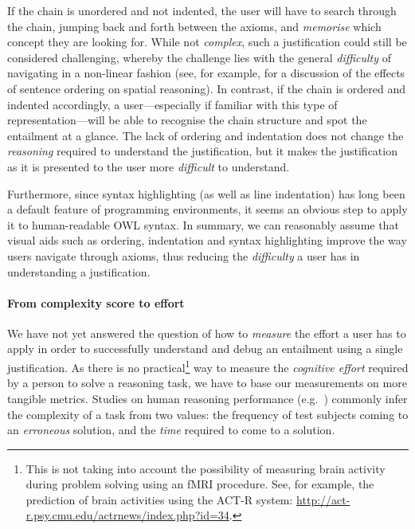 If the chain is unordered and not indented, the user will have to search through the chain, jumping back and forth between the axioms, and \emph{memorise} which concept they are looking for. While not \emph{complex}, such a justification could still be considered challenging, whereby the challenge lies with the general \emph{difficulty} of navigating in a non-linear fashion (see, for example, \cite{johnson-laird80kt} for a discussion of the effects of sentence ordering on spatial reasoning). In contrast, if the chain is ordered and indented accordingly, a user---especially if familiar with this type of representation---will be able to recognise the chain structure and spot the entailment at a glance. The lack of ordering and indentation does not change the \emph{reasoning} required to understand the justification, but it makes the justification as it is presented to the user more \emph{difficult} to understand. 

Furthermore, since syntax highlighting (as well as line indentation) has long been a default feature of programming environments, it seems an obvious step to apply it to human-readable OWL syntax. In summary, we can reasonably assume that visual aids such as ordering, indentation and syntax highlighting improve the way users navigate through axioms, thus reducing the \emph{difficulty} a user has in understanding a justification.

\paragraph{From complexity score to effort}

We have not yet answered the question of how to \emph{measure} the effort a user has to apply in order to successfully understand and debug an entailment using a single justification. As there is no practical\footnote{This is not taking into account the possibility of measuring brain activity during problem solving using an fMRI procedure. See, for example, the prediction of brain activities using the ACT-R system: \url{http://act-r.psy.cmu.edu/actrnews/index.php?id=34}.} way to measure the \emph{cognitive effort} required by a person to solve a reasoning task, we have to base our measurements on more tangible metrics. Studies on human reasoning performance (e.g.\ \cite{newstead06nz}) commonly infer the complexity of a task from two values: the frequency of test subjects coming to an \emph{erroneous} solution, and the \emph{time} required to come to a solution. 


